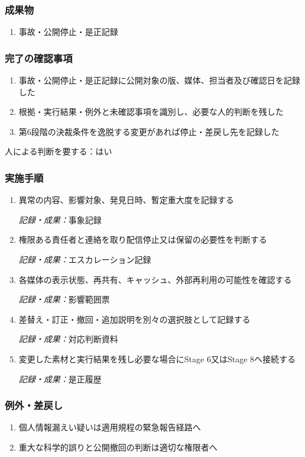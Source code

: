 \documentclass[a4paper,11pt]{article}
\begin{document}
\subsubsection*{成果物}
\begin{enumerate}[leftmargin=2em,itemsep=0.35em]
\item 事故・公開停止・是正記録
\end{enumerate}
\subsubsection*{完了の確認事項}
\begin{enumerate}[leftmargin=2em,itemsep=0.35em]
\item 事故・公開停止・是正記録に公開対象の版、媒体、担当者及び確認日を記録した
\item 根拠・実行結果・例外と未確認事項を識別し、必要な人的判断を残した
\item 第6段階の決裁条件を逸脱する変更があれば停止・差戻し先を記録した
\end{enumerate}
\par 人による判断を要する：はい\par\medskip
\subsubsection*{実施手順}
\begin{enumerate}[leftmargin=2em,itemsep=0.65em]
\item 異常の内容、影響対象、発見日時、暫定重大度を記録する\par\noindent\textit{記録・成果：}事象記録\nobreak\smallskip
\item 権限ある責任者と連絡を取り配信停止又は保留の必要性を判断する\par\noindent\textit{記録・成果：}エスカレーション記録\nobreak\smallskip
\item 各媒体の表示状態、再共有、キャッシュ、外部再利用の可能性を確認する\par\noindent\textit{記録・成果：}影響範囲票\nobreak\smallskip
\item 差替え・訂正・撤回・追加説明を別々の選択肢として記録する\par\noindent\textit{記録・成果：}対応判断資料\nobreak\smallskip
\item 変更した素材と実行結果を残し必要な場合にStage 6又はStage 8へ接続する\par\noindent\textit{記録・成果：}是正履歴\nobreak\smallskip
\end{enumerate}
\subsubsection*{例外・差戻し}
\begin{enumerate}[leftmargin=2em,itemsep=0.35em]
\item 個人情報漏えい疑いは適用規程の緊急報告経路へ
\item 重大な科学的誤りと公開撤回の判断は適切な権限者へ
\end{enumerate}
\end{document}
